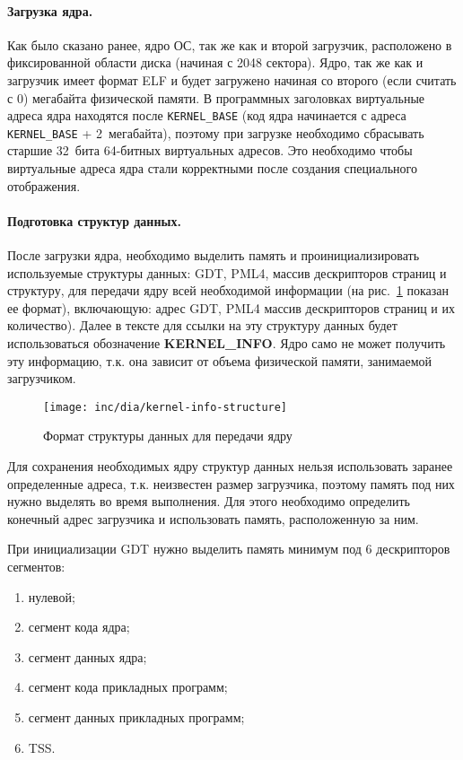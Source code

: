 \paragraph{Загрузка ядра.} Как было сказано ранее, ядро ОС, так же как и второй загрузчик,
расположено в фиксированной области диска (начиная с 2048 сектора). Ядро, так же как и загрузчик
имеет формат ELF и будет загружено начиная со второго (если считать с 0) мегабайта физической
памяти. В программных заголовках виртуальные адреса ядра находятся после \texttt{KERNEL\_BASE} (код
ядра начинается с адреса \texttt{KERNEL\_BASE} + 2~мегабайта), поэтому при загрузке необходимо
сбрасывать старшие 32~бита 64-битных виртуальных адресов. Это необходимо чтобы виртуальные адреса
ядра стали корректными после создания специального отображения.

\paragraph{Подготовка структур данных.} После загрузки ядра, необходимо выделить память и проинициализировать
используемые структуры данных: GDT, PML4, массив дескрипторов страниц и структуру, для передачи
ядру всей необходимой информации (на рис.~\ref{fig:kernel-info-structure} показан ее формат), включающую:
адрес GDT, PML4 массив дескрипторов страниц и их количество). Далее в тексте для ссылки на эту структуру
данных будет использоваться обозначение \textbf{KERNEL\_INFO}. Ядро само не может получить эту информацию,
т.к. она зависит от объема физической памяти, занимаемой загрузчиком.

\begin{figure}[ht!]
  \centering
  \texttt{[image: inc/dia/kernel-info-structure]}
  \caption{Формат структуры данных для передачи ядру}
  \label{fig:kernel-info-structure}
\end{figure}

Для сохранения необходимых ядру структур данных нельзя использовать заранее определенные адреса,
т.к. неизвестен размер загрузчика, поэтому память под них нужно выделять во время выполнения. Для
этого необходимо определить конечный адрес загрузчика и использовать память, расположенную за ним.

При инициализации GDT нужно выделить память минимум под 6 дескрипторов сегментов:
\begin{enumerate}[1.]
\item нулевой;
\item сегмент кода ядра;
\item сегмент данных ядра;
\item сегмент кода прикладных программ;
\item сегмент данных прикладных программ;
\item TSS.
\end{enumerate}

